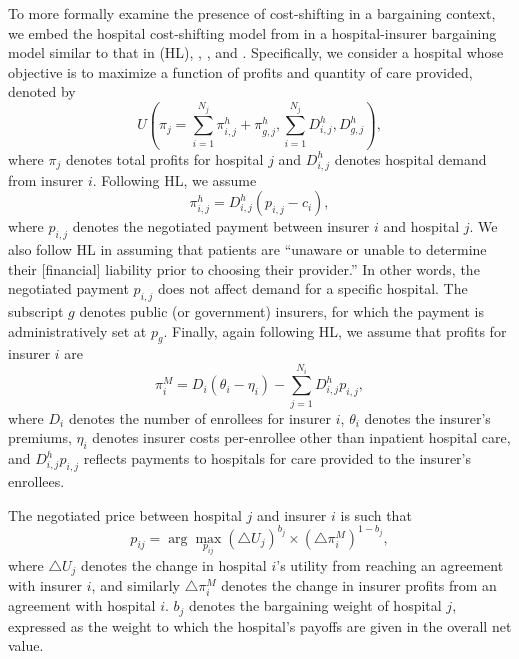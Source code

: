 \documentclass[12pt]{article}
\begin{document}
To more formally examine the presence of cost-shifting in a bargaining context, we embed the hospital cost-shifting model from \cite{dranove1988} in a hospital-insurer bargaining model similar to that in \cite{ho2017} (HL), \cite{gowrisankaran2015}, \cite{lewis2015}, and \cite{dor2004}. Specifically, we consider a hospital whose objective is to maximize a function of profits and quantity of care provided, denoted by
\begin{equation}
 U\left( \pi_{j} = \sum_{i=1}^{N_{j}} \pi_{i,j}^{h} + \pi_{g,j}^{h}, \sum_{i=1}^{N_{j}} D_{i,j}^{h}, D_{g,j}^{h} \right),
\label{eqn:nfp_objective}
\end{equation}
where $\pi_{j}$ denotes total profits for hospital $j$ and $D_{i,j}^{h}$ denotes hospital demand from insurer $i$. Following HL, we assume $$\pi_{i,j}^{h}=D_{i,j}^{h}(p_{i,j}-c_{i}),$$ where $p_{i,j}$ denotes the negotiated payment between insurer $i$ and hospital $j$. We also follow HL in assuming that patients are ``unaware or unable to determine their [financial] liability prior to choosing their provider.'' In other words, the negotiated payment $p_{i,j}$ does not affect demand for a specific hospital. The subscript $g$ denotes public (or government) insurers, for which the payment is administratively set at $p_{g}$. Finally, again following HL, we assume that profits for insurer $i$ are
\begin{equation}
\pi_{i}^{M} = D_{i} \left( \theta_{i} - \eta_{i} \right) - \sum_{j=1}^{N_{i}} D_{i,j}^{h} p_{i,j},
\label{eqn:ins_profit}
\end{equation}
where $D_{i}$ denotes the number of enrollees for insurer $i$, $\theta_{i}$ denotes the insurer's premiums, $\eta_{i}$ denotes insurer costs per-enrollee other than inpatient hospital care, and $D_{i,j}^{h} p_{i,j}$ reflects payments to hospitals for care provided to the insurer's enrollees.

The negotiated price between hospital $j$ and insurer $i$ is such that
\begin{equation}
 p_{ij}= \arg \max_{p_{ij}} \left(\triangle U_{j} \right)^{b_{j}} \times \left(\triangle \pi^{M}_{i} \right)^{1-b_{j}},
 \label{eqn:neg_price}
\end{equation}
where $\triangle U_{j}$ denotes the change in hospital $i$'s utility from reaching an agreement with insurer $i$, and similarly $\triangle \pi^{M}_{i}$ denotes the change in insurer profits from an agreement with hospital $i$. $b_{j}$ denotes the bargaining weight of hospital $j$, expressed as the weight to which the hospital's payoffs are given in the overall net value.
\end{document}
